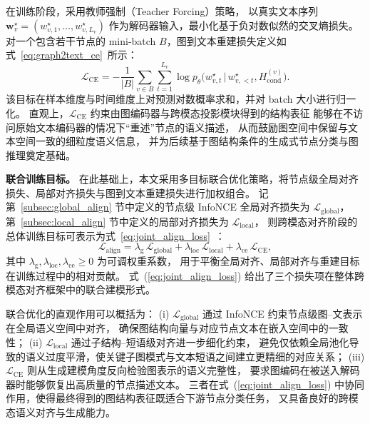 在训练阶段，采用教师强制（Teacher Forcing）策略，
以真实文本序列
\(
\mathbf{w}_v^\star = (w_{v,1}^\star,\dots,w_{v,L_v}^\star)
\)
作为解码器输入，最小化基于负对数似然的交叉熵损失。
对一个包含若干节点的 mini-batch $B$，图到文本重建损失定义如式~\ref{eq:graph2text_ce}\ 所示：
\begin{equation}
  \mathcal{L}_{\mathrm{CE}}
  =
  -\frac{1}{|B|}
  \sum_{v \in B}
  \sum_{t=1}^{L_v}
  \log
  p_\theta\big(
    w_{v,t}^\star
    \,\big|\,
    w_{v,<t}^\star,
    H_{\mathrm{cond}}^{(v)}
  \big).
  \label{eq:graph2text_ce}
\end{equation}
该目标在样本维度与时间维度上对预测对数概率求和，并对 batch 大小进行归一化。
直观上，$\mathcal{L}_{\mathrm{CE}}$ 约束由图编码器与跨模态投影模块得到的结构表征
能够在不访问原始文本编码器的情况下“重述”节点的语义描述，
从而鼓励图空间中保留与文本空间一致的细粒度语义信息，
并为后续基于图结构条件的生成式节点分类与图推理奠定基础。

\textbf{联合训练目标。}
在此基础上，本文采用多目标联合优化策略，将节点级全局对齐损失、局部对齐损失与图到文本重建损失进行加权组合。
记第~\ref{subsec:global_align} 节中定义的节点级 InfoNCE 全局对齐损失为 $\mathcal{L}_{\mathrm{global}}$，
第~\ref{subsec:local_align} 节中定义的局部对齐损失为 $\mathcal{L}_{\mathrm{local}}$，
则跨模态对齐阶段的总体训练目标可表示为式~\ref{eq:joint_align_loss}\ ：
\begin{equation}
  \mathcal{L}_{\mathrm{align}}
  =
  \lambda_{\mathrm{g}} \,\mathcal{L}_{\mathrm{global}}
  +
  \lambda_{\mathrm{loc}} \,\mathcal{L}_{\mathrm{local}}
  +
  \lambda_{\mathrm{ce}} \,\mathcal{L}_{\mathrm{CE}},
  \label{eq:joint_align_loss}
\end{equation}
其中 $\lambda_{\mathrm{g}},\lambda_{\mathrm{loc}},\lambda_{\mathrm{ce}} \ge 0$ 为可调权重系数，
用于平衡全局对齐、局部对齐与重建目标在训练过程中的相对贡献。
式~(\ref{eq:joint_align_loss}) 给出了三个损失项在整体跨模态对齐框架中的联合建模形式。

联合优化的直观作用可以概括为：
(i) $\mathcal{L}_{\mathrm{global}}$ 通过 InfoNCE 约束节点级图--文表示在全局语义空间中对齐，
确保图结构向量与对应节点文本在嵌入空间中的一致性；
(ii) $\mathcal{L}_{\mathrm{local}}$ 通过子结构--短语级对齐进一步细化约束，
避免仅依赖全局池化导致的语义过度平滑，使关键子图模式与文本短语之间建立更精细的对应关系；
(iii) $\mathcal{L}_{\mathrm{CE}}$ 则从生成建模角度反向检验图表示的语义完整性，
要求图编码在被送入解码器时能够恢复出高质量的节点描述文本。
三者在式~(\ref{eq:joint_align_loss}) 中协同作用，使得最终得到的图结构表征既适合下游节点分类任务，
又具备良好的跨模态语义对齐与生成能力。

